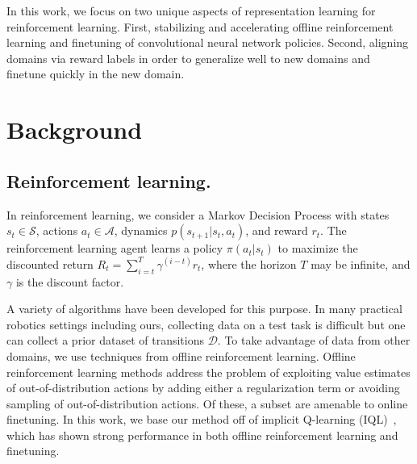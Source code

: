 In this work, we focus on two unique aspects of representation learning for reinforcement learning. First, stabilizing and accelerating offline reinforcement learning and finetuning of convolutional neural network policies. Second, aligning domains via reward labels in order to generalize well to new domains and finetune quickly in the new domain.

\section{Background}

\subsection{Reinforcement learning.}

In reinforcement learning, we consider a Markov Decision Process with states $s_t \in \mathcal{S}$, actions $a_t \in \mathcal{A}$, dynamics $p(s_{t+1}|s_t, a_t)$, and reward $r_t$. The reinforcement learning agent learns a policy $\pi(a_t|s_t)$ to maximize the discounted return $R_t = \sum_{i=t}^T \gamma^(i-t) r_t$, where the horizon $T$ may be infinite, and $\gamma$ is the discount factor.

A variety of algorithms have been developed for this purpose. In many practical robotics settings including ours, collecting data on a test task is difficult but one can collect a prior dataset of transitions $\mathcal{D}$. To take advantage of data from other domains, we use techniques from offline reinforcement learning. Offline reinforcement learning methods address the problem of exploiting value estimates of out-of-distribution actions by adding either a regularization term or avoiding sampling of out-of-distribution actions. Of these, a subset are amenable to online finetuning. In this work, we base our method off of implicit Q-learning (IQL)~\cite{kostrikov2021iql}, which has shown strong performance in both offline reinforcement learning and finetuning.

